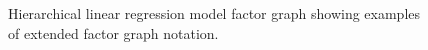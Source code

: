 
%

\begin{figure}[!t]
\vskip 0pt
\centering
{}
\caption[Hierarchical linear regression model factor graph.]{Hierarchical linear regression model factor graph showing examples of extended factor graph notation.}%
\label{fig:hier-lin-regression-factor-graph}
\end{figure}

